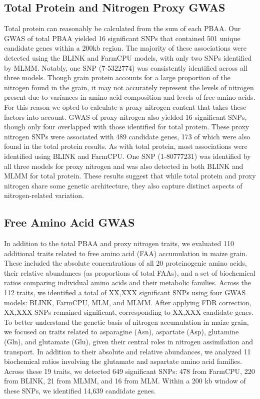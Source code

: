 \documentclass[pdflatex,sn-mathphys-num]{sn-jnl}%
\theoremstyle{thmstyleone}%
\theoremstyle{thmstyletwo}%
\theoremstyle{thmstylethree}%
\begin{document}
\subsection{Total Protein and Nitrogen Proxy GWAS}
Total protein can reasonably be calculated from the sum of each PBAA. Our GWAS of total PBAA yielded 16 significant SNPs that contained 501 unique candidate genes within a 200kb region. The majority of these associations were detected using the BLINK and FarmCPU models, with only two SNPs identified by MLMM. Notably, one SNP (7-5322774) was consistently identified across all three models. Though grain protein accounts for a large proportion of the nitrogen found in the grain, it may not accurately represent the levels of nitrogen present due to variances in amino acid composition and levels of free amino acids. For this reason we opted to calculate a proxy nitrogen content that takes these factors into account. GWAS of proxy nitrogen also yielded 16 significant SNPs, though only four overlapped with those identified for total protein. These proxy nitrogen SNPs were associated with 489 candidate genes, 173 of which were also found in the total protein results. As with total protein, most associations were identified using BLINK and FarmCPU. One SNP (1-80777231) was identified by all three models for proxy nitrogen and was also detected in both BLINK and MLMM for total protein. These results suggest that while total protein and proxy nitrogen share some genetic architecture, they also capture distinct aspects of nitrogen-related variation. 



\subsection{Free Amino Acid GWAS}
In addition to the total PBAA and proxy nitrogen traits, we evaluated 110 additional traits related to free amino acid (FAA) accumulation in maize grain. These included the absolute concentrations of all 20 proteinogenic amino acids, their relative abundances (as proportions of total FAAs), and a set of biochemical ratios comparing individual amino acids and their metabolic families. Across the 112 traits, we identified a total of XX,XXX significant SNPs using four GWAS models: BLINK, FarmCPU, MLM, and MLMM. After applying FDR correction, XX,XXX SNPs remained significant, corresponding to XX,XXX candidate genes. To better understand the genetic basis of nitrogen accumulation in maize grain, we focused on traits related to asparagine (Asn), aspartate (Asp), glutamine (Gln), and glutamate (Glu), given their central roles in nitrogen assimilation and transport. In addition to their absolute and relative abundances, we analyzed 11 biochemical ratios involving the glutamate and aspartate amino acid families. Across these 19 traits, we detected 649 significant SNPs: 478 from FarmCPU, 220 from BLINK, 21 from MLMM, and 16 from MLM. Within a 200 kb window of these SNPs, we identified 14,639 candidate genes.
\end{document}
